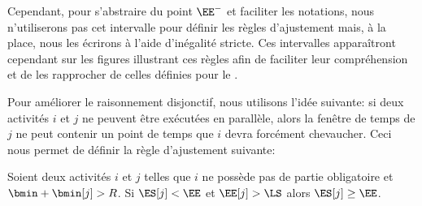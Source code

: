 Cependant, pour s'abstraire du point $\EE^{-}$ et faciliter les
notations, nous n'utiliserons pas cet intervalle pour définir les
règles d'ajustement mais, à la place, nous les écrirons à l'aide
d'inégalité stricte. Ces intervalles apparaîtront cependant sur les
figures illustrant ces règles afin de faciliter leur compréhension et
de les rapprocher de celles définies pour le \CUSP.

Pour améliorer le raisonnement disjonctif, nous utilisons l'idée
suivante: si deux activités $i$ et $j$ ne peuvent être exécutées en
parallèle, alors la fenêtre de temps de $j$ ne peut contenir un point
de temps que $i$ devra forcément chevaucher. Ceci nous permet de
définir la règle d'ajustement suivante:   

\begin{reg}
\label{reg:RDR_CECSP}
  Soient deux activités $i$ et $j$ telles que $i$ ne possède pas de
  partie obligatoire et $\bmin + \bmin[j] > R$. Si $\ES[j] < \EE$ et $
  \EE[j] > \LS$ alors $\ES[j] \ge \EE$.
\end{reg}

